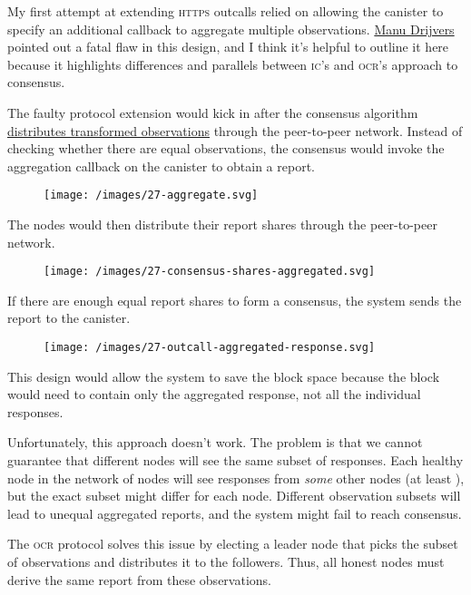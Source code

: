 \documentclass{article}
\begin{document}
My first attempt at extending \textsc{https} outcalls relied on allowing the canister to specify an additional callback to aggregate multiple observations.
\href{https://manu.drijve.rs/}{Manu Drijvers} pointed out a fatal flaw in this design, and I think it's helpful to outline it here because it highlights differences and parallels between \textsc{ic}'s and \textsc{ocr}'s approach to consensus.

The faulty protocol extension would kick in after the consensus algorithm \href{#fig-consensus-shares-transformed}{distributes transformed observations} through the peer-to-peer network.
Instead of checking whether there are  equal observations, the consensus would invoke the aggregation callback on the canister to obtain a report.

\begin{figure}[grayscale-diagram,p75]
\texttt{[image: /images/27-aggregate.svg]}
\end{figure}

The nodes would then distribute their report shares through the peer-to-peer network.

\begin{figure}[grayscale-diagram,p75]
\texttt{[image: /images/27-consensus-shares-aggregated.svg]}
\end{figure}

If there are enough equal report shares to form a consensus, the system sends the report to the canister.

\begin{figure}[grayscale-diagram,p75]
\texttt{[image: /images/27-outcall-aggregated-response.svg]}
\end{figure}

This design would allow the system to save the block space because the block would need to contain only the aggregated response, not all the individual responses.

Unfortunately, this approach doesn't work.
The problem is that we cannot guarantee that different nodes will see the same subset of responses.
Each healthy node in the network of  nodes will see responses from \emph{some} other nodes (at least ), but the exact subset might differ for each node.
Different observation subsets will lead to unequal aggregated reports, and the system might fail to reach consensus.

The \textsc{ocr} protocol solves this issue by electing a leader node that picks the subset of observations and distributes it to the followers.
Thus, all honest nodes must derive the same report from these observations.
\end{document}
